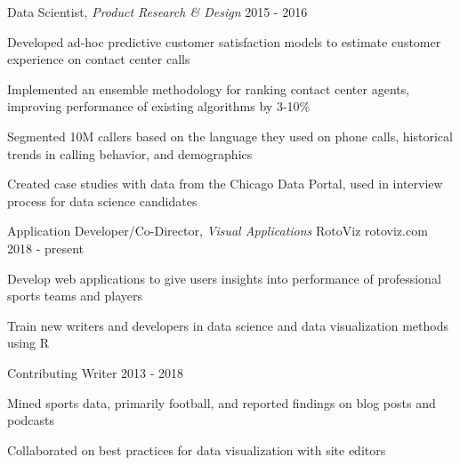 \begin{cventries}
  \cventry
    {Data Scientist, \textit{Product Research \& Design}} %
    {} %
    {} %
    {2015 - 2016} %
    {
      \begin{cvitems} %
        \item {Developed ad-hoc predictive customer satisfaction models to estimate customer experience on contact center calls}
        \item {Implemented an ensemble methodology for ranking contact center agents, improving performance of existing algorithms by 3-10\%}
        \item {Segmented 10M callers based on the language they used on phone calls, historical trends in calling behavior, and demographics}
        \item {Created case studies with data from the Chicago Data Portal, used in interview process for data science candidates}
      \end{cvitems}
    }

 \cventry
    {Application Developer/Co-Director, \textit{Visual Applications}}
    {RotoViz}
    {rotoviz.com}
    {2018 - present}
    {
     \begin{cvitems}
       \item {Develop web applications to give users insights into performance of professional sports teams and players}
       \item {Train new writers and developers in data science and data visualization methods using R}
     \end{cvitems}
   }
   
   \cventry
   {Contributing Writer}
   {}
   {}
   {2013 - 2018}
   {
      \begin{cvitems}
       \item {Mined sports data, primarily football, and reported findings on blog posts and podcasts}
       \item {Collaborated on best practices for data visualization with site editors}
      \end{cvitems}
    }


\end{cventries}
